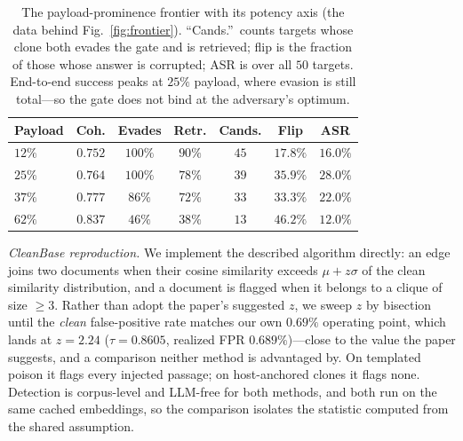 \documentclass[10pt,journal,compsoc]{IEEEtran}
\begin{document}
\begin{table}[H]
\centering
\caption{The payload-prominence frontier with its potency axis (the data behind
Fig.~\ref{fig:frontier}). ``Cands.''\ counts targets whose clone both evades the gate and is
retrieved; flip is the fraction of those whose answer is corrupted; ASR is over all $50$
targets. End-to-end success peaks at $25\%$ payload, where evasion is still total---so the gate
does not bind at the adversary's optimum.}
\label{tab:frontier}
\begin{tabular}{lcccccc}
\toprule
Payload & Coh. & Evades & Retr. & Cands. & Flip & ASR \\
\midrule
$12\%$ & $0.752$ & $100\%$ & $90\%$ & $45$ & $17.8\%$ & $16.0\%$ \\
$25\%$ & $0.764$ & $100\%$ & $78\%$ & $39$ & $35.9\%$ & $\mathbf{28.0\%}$ \\
$37\%$ & $0.777$ & $86\%$  & $72\%$ & $33$ & $33.3\%$ & $22.0\%$ \\
$62\%$ & $0.837$ & $46\%$  & $38\%$ & $13$ & $46.2\%$ & $12.0\%$ \\
\bottomrule
\end{tabular}
\end{table}

\emph{CleanBase reproduction.} We implement the described algorithm directly: an edge joins two
documents when their cosine similarity exceeds $\mu + z\sigma$ of the clean similarity
distribution, and a document is flagged when it belongs to a clique of size $\ge 3$. Rather than
adopt the paper's suggested $z$, we sweep $z$ by bisection until the \emph{clean} false-positive
rate matches our own $0.69\%$ operating point, which lands at $z=2.24$ ($\tau=0.8605$,
realized FPR $0.689\%$)---close to the value the paper suggests, and a comparison neither method
is advantaged by. On templated poison it flags every injected passage; on host-anchored clones
it flags none. Detection is corpus-level and LLM-free for both methods, and both run on the same
cached embeddings, so the comparison isolates the statistic computed from the shared assumption.
\end{document}

